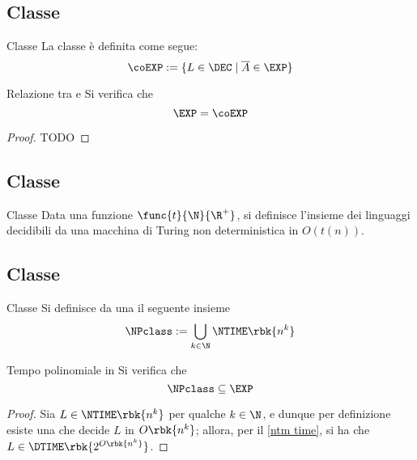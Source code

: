 \documentclass[a4paper, 12pt]{report}
\begin{document}
    \subsection{Classe \coEXP}

    \begin{frameddefn}{Classe \coEXP}
        La classe \coEXP è definita come segue: $$\coEXP := \{L \in \DEC \mid \overline A \in \EXP\}$$
    \end{frameddefn}

    \begin{framedthm}[label={exp = coexp}]{Relazione tra \EXP e \coEXP}
        Si verifica che $$\EXP = \coEXP$$
    \end{framedthm}

    \begin{proof}
        TODO
    \end{proof}

    \subsection{Classe \NTIME}

    \begin{frameddefn}{Classe \NTIME}
        Data una funzione $\func{t}{\N}{\R^+}$, si definisce  l'insieme dei linguaggi decidibili da una macchina di Turing non deterministica in $O(t(n))$.
    \end{frameddefn}

    \subsection{Classe \NPclass}
    
    \begin{frameddefn}[label={np def}]{Classe \NPclass}
        Si definisce  da una \NTM il seguente insieme $$\NPclass := \bigcup_{k \in \N}{\NTIME \rbk{n^k}}$$
    \end{frameddefn}

    \begin{framedprop}[label={np exp}]{Tempo polinomiale in \NTIME}
        Si verifica che $$\NPclass \subseteq \EXP$$
    \end{framedprop}

    \begin{proof}
        Sia $L \in \NTIME\rbk{n^k}$ per qualche $k \in \N$, e dunque per definizione esiste una \NTM che decide $L$ in $O\rbk{n^k}$; allora, per il \cref{ntm time}, si ha che $L \in \DTIME \rbk{2^{O\rbk{n^k}}}$.
    \end{proof}
\end{document}
